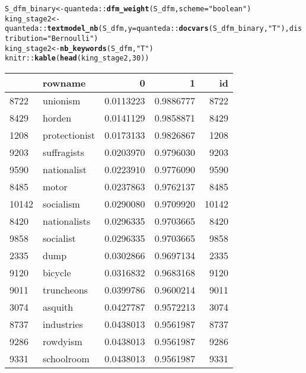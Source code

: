 \documentclass{article}\usepackage[]{graphicx}\usepackage[]{color}
\makeatletter
\newcommand{\hlnum}[1]{\textcolor[rgb]{0.686,0.059,0.569}{#1}}%
\newcommand{\hlstr}[1]{\textcolor[rgb]{0.192,0.494,0.8}{#1}}%
\newcommand{\hlopt}[1]{\textcolor[rgb]{0,0,0}{#1}}%
\newcommand{\hlstd}[1]{\textcolor[rgb]{0.345,0.345,0.345}{#1}}%
\newcommand{\hlkwb}[1]{\textcolor[rgb]{0.69,0.353,0.396}{#1}}%
\newcommand{\hlkwc}[1]{\textcolor[rgb]{0.333,0.667,0.333}{#1}}%
\newcommand{\hlkwd}[1]{\textcolor[rgb]{0.737,0.353,0.396}{\textbf{#1}}}%
\newenvironment{kframe}{%
 \def\at@end@of@kframe{}%
 \ifinner\ifhmode%
  \def\at@end@of@kframe{\end{minipage}}%
  \begin{minipage}{\columnwidth}%
 \fi\fi%
 \def\FrameCommand##1{\hskip\@totalleftmargin \hskip-\fboxsep
 \colorbox{shadecolor}{##1}\hskip-\fboxsep
     \hskip-\linewidth \hskip-\@totalleftmargin \hskip\columnwidth}%
 \MakeFramed {\advance\hsize-\width
   \@totalleftmargin\z@ \linewidth\hsize
   \@setminipage}}%
 {\par\unskip\endMakeFramed%
 \at@end@of@kframe}
\newenvironment{knitrout}{}{} %
\makeatother
\begin{document}
\begin{knitrout}
\color{fgcolor}\begin{kframe}
\begin{alltt}
\hlstd{S_dfm_binary}\hlkwb{<-}\hlstd{quanteda}\hlopt{::}\hlkwd{dfm_weight}\hlstd{(S_dfm,} \hlkwc{scheme}\hlstd{=}\hlstr{"boolean"}\hlstd{)}
\hlstd{king_stage2} \hlkwb{<-} \hlstd{quanteda}\hlopt{::}\hlkwd{textmodel_nb}\hlstd{(S_dfm,} \hlkwc{y}\hlstd{=quanteda}\hlopt{::}\hlkwd{docvars}\hlstd{(S_dfm_binary,} \hlstr{"T"}\hlstd{),} \hlkwc{distribution}\hlstd{=}\hlstr{"Bernoulli"}\hlstd{)}
\hlstd{king_stage2} \hlkwb{<-} \hlkwd{nb_keywords}\hlstd{(S_dfm,} \hlstr{"T"}\hlstd{)}
\hlstd{knitr}\hlopt{::}\hlkwd{kable}\hlstd{(}\hlkwd{head}\hlstd{(king_stage2,} \hlnum{30}\hlstd{))}
\end{alltt}
\end{kframe}
\begin{tabular}{l|l|r|r|r}
\hline
  & rowname & 0 & 1 & id\\
\hline
8722 & unionism & 0.0113223 & 0.9886777 & 8722\\
\hline
8429 & horden & 0.0141129 & 0.9858871 & 8429\\
\hline
1208 & protectionist & 0.0173133 & 0.9826867 & 1208\\
\hline
9203 & suffragists & 0.0203970 & 0.9796030 & 9203\\
\hline
9590 & nationalist & 0.0223910 & 0.9776090 & 9590\\
\hline
8485 & motor & 0.0237863 & 0.9762137 & 8485\\
\hline
10142 & socialism & 0.0290080 & 0.9709920 & 10142\\
\hline
8420 & nationalists & 0.0296335 & 0.9703665 & 8420\\
\hline
9858 & socialist & 0.0296335 & 0.9703665 & 9858\\
\hline
2335 & dump & 0.0302866 & 0.9697134 & 2335\\
\hline
9120 & bicycle & 0.0316832 & 0.9683168 & 9120\\
\hline
9011 & truncheons & 0.0399786 & 0.9600214 & 9011\\
\hline
3074 & asquith & 0.0427787 & 0.9572213 & 3074\\
\hline
8737 & industries & 0.0438013 & 0.9561987 & 8737\\
\hline
9286 & rowdyism & 0.0438013 & 0.9561987 & 9286\\
\hline
9331 & schoolroom & 0.0438013 & 0.9561987 & 9331\\

\end{tabular}
\end{knitrout}
\end{document}
